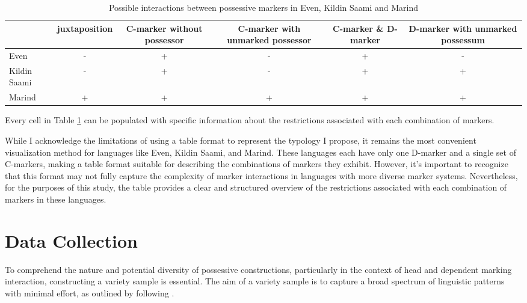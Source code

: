 \begin{table}[h!]
	\centering
	\small
	\begin{tabular}{@{}lccccc@{}}
		\toprule
		& juxtaposition & \parbox{2.5cm}{C-marker without possessor} &  \parbox{2.75cm}{C-marker with unmarked possessor} & \parbox{1.75cm}{C-marker \& D-marker} &  \parbox{3cm}{D-marker with unmarked possessum} \\ \midrule
		Even         & -             & +                          & -                                & +                    & -                                \\
		Kildin Saami & -             & +                          & -                                & +                    & +                                \\
		Marind       & +             & +                          & +                                & +                    & +                                \\ \bottomrule
	\end{tabular}
	\caption{Possible interactions between possessive markers in Even, Kildin Saami and Marind}\label{tab:even_saami_marind}
\end{table}

Every cell in Table \ref{tab:even_saami_marind} can be populated with specific information about the restrictions associated with each combination of markers. 

While I acknowledge the limitations of using a table format to represent the typology I propose, it remains the most convenient visualization method for languages like Even, Kildin Saami, and Marind. These languages each have only one D-marker and a single set of C-markers, making a table format suitable for describing the combinations of markers they exhibit. However, it's important to recognize that this format may not fully capture the complexity of marker interactions in languages with more diverse marker systems. Nevertheless, for the purposes of this study, the table provides a clear and structured overview of the restrictions associated with each combination of markers in these languages.

\section{Data Collection}

To comprehend the nature and potential diversity of possessive constructions, particularly in the context of head and dependent marking interaction, constructing a variety sample is essential. The aim of a variety sample is to capture a broad spectrum of linguistic patterns with minimal effort, as outlined by \cite{miestamo2016sampling} following \citealt{rijkhoff1993method}.


